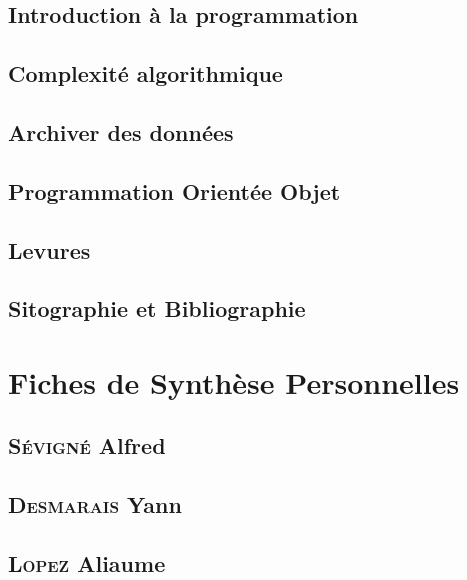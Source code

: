 \documentclass[a4paper,15pt]{report}
\begin{document}
\begin{appendix}

\chapter{Introduction à la programmation}
  
\chapter{Complexité algorithmique}

\chapter{Archiver des données}
	
\chapter{Programmation Orientée Objet}
	
\chapter{Levures}
	

\end{appendix}

\chapter{Sitographie et Bibliographie}
  
  
  
\part*{Fiches de Synthèse Personnelles}
  \chapter*{\textsc{Sévigné} Alfred}
    
  \chapter*{\textsc{Desmarais} Yann}
    
  \chapter*{\textsc{Lopez} Aliaume}
    
\end{document}
